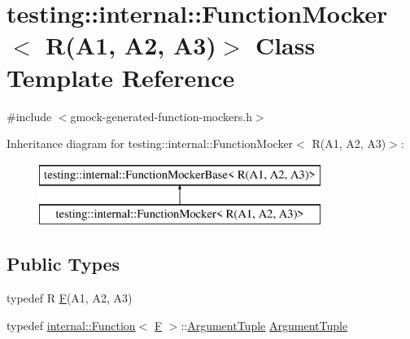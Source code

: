 \hypertarget{classtesting_1_1internal_1_1_function_mocker_3_01_r_07_a1_00_01_a2_00_01_a3_08_4}{}\section{testing\+::internal\+::Function\+Mocker$<$ R(A1, A2, A3)$>$ Class Template Reference}
\label{classtesting_1_1internal_1_1_function_mocker_3_01_r_07_a1_00_01_a2_00_01_a3_08_4}


{\ttfamily \#include $<$gmock-\/generated-\/function-\/mockers.\+h$>$}

Inheritance diagram for testing\+::internal\+::Function\+Mocker$<$ R(A1, A2, A3)$>$\+:\begin{figure}[H]
\begin{center}
\leavevmode
\includegraphics[height=2.000000cm]{de/daa/classtesting_1_1internal_1_1_function_mocker_3_01_r_07_a1_00_01_a2_00_01_a3_08_4}
\end{center}
\end{figure}
\subsection*{Public Types}
\begin{DoxyCompactItemize}
\item 
typedef R \mbox{\hyperlink{classtesting_1_1internal_1_1_function_mocker_3_01_r_07_a1_00_01_a2_00_01_a3_08_4_a8c471830f963b8012785eb3eeca2cc9c}{F}}(A1, A2, A3)
\item 
typedef \mbox{\hyperlink{structtesting_1_1internal_1_1_function}{internal\+::\+Function}}$<$ \mbox{\hyperlink{classtesting_1_1internal_1_1_function_mocker_3_01_r_07_a1_00_01_a2_00_01_a3_08_4_a8c471830f963b8012785eb3eeca2cc9c}{F}} $>$\+::\mbox{\hyperlink{classtesting_1_1internal_1_1_function_mocker_3_01_r_07_a1_00_01_a2_00_01_a3_08_4_a347dcf4c054a5f1fbd0e2f0ad1c5e2f3}{Argument\+Tuple}} \mbox{\hyperlink{classtesting_1_1internal_1_1_function_mocker_3_01_r_07_a1_00_01_a2_00_01_a3_08_4_a347dcf4c054a5f1fbd0e2f0ad1c5e2f3}{Argument\+Tuple}}
\end{DoxyCompactItemize}
